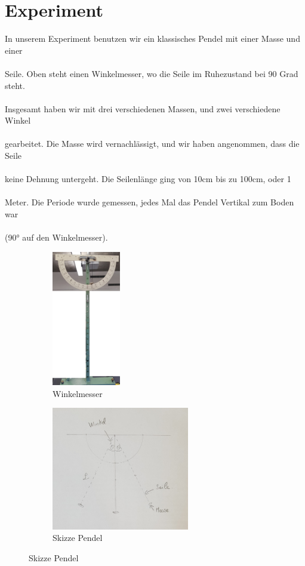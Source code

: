 \documentclass[12pt, a4paper, twoside]{article}
\begin{document}
        \section{Experiment}
        In unserem Experiment benutzen wir ein klassisches Pendel mit einer Masse und einer\\\\
        Seile. Oben steht einen Winkelmesser, wo die Seile im Ruhezustand bei 90 Grad steht.\\\\
        Insgesamt haben wir mit drei verschiedenen Massen, und zwei verschiedene Winkel\\\\
        gearbeitet. Die Masse wird vernachlässigt, und wir haben angenommen, dass die Seile\\\\
        keine Dehnung untergeht. Die Seilenlänge ging von 10cm bis zu 100cm, oder 1\\\\
        Meter. Die Periode wurde gemessen, jedes Mal das Pendel Vertikal zum Boden war\\\\
        (90° auf den Winkelmesser). 
        \vfill
        \begin{figure}[h!]
            \begin{subfigure}{.5\textwidth}
                \centering
                \includegraphics[scale=0.25, width=3cm]{Winkelmesser.png}
                \caption{Winkelmesser}
                \label{fig:winkelmesser}
            \end{subfigure}
            \begin{subfigure}{.5\textwidth}
                \centering
                \includegraphics[scale=0.5, width=6cm]{Pendulum.jpeg}
                \caption{Skizze Pendel}
                \label{fig:Pendulum}
            \end{subfigure}
        \end{figure}
        \newpage
\end{document}
